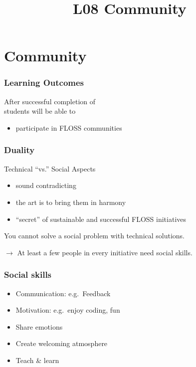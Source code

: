

\title{L08 Community}




\section{Community}


\begin{frame}
	\frametitle{Learning Outcomes}
	After successful completion of \inserttitle \\
	students will be able to

	\begin{itemize}
	\item participate in FLOSS communities
	\end{itemize}
\end{frame}

\begin{frame}
	\frametitle{Duality}
	Technical ``vs.'' Social Aspects

	\begin{itemize}[<+-| alert@+>]
		\item sound contradicting
		\item the art is to bring them in harmony
		\item ``secret'' of sustainable and successful FLOSS initiatives
	\end{itemize}
	\vspace{1em}
	\pause[\thebeamerpauses]  %

	You cannot solve a social problem with technical solutions.
	\vspace{1em}
	\pause

	$\rightarrow$ At least a few people in every initiative need social skills.
\end{frame}

\begin{frame}
	\frametitle{Social skills}

	\begin{itemize}[<+-| alert@+>]
		\item Communication: e.g.\ Feedback
		\item Motivation: e.g.\ enjoy coding, fun
		\item Share emotions
		\item Create welcoming atmosphere
		\item Teach \& learn
	\end{itemize}
\end{frame}

